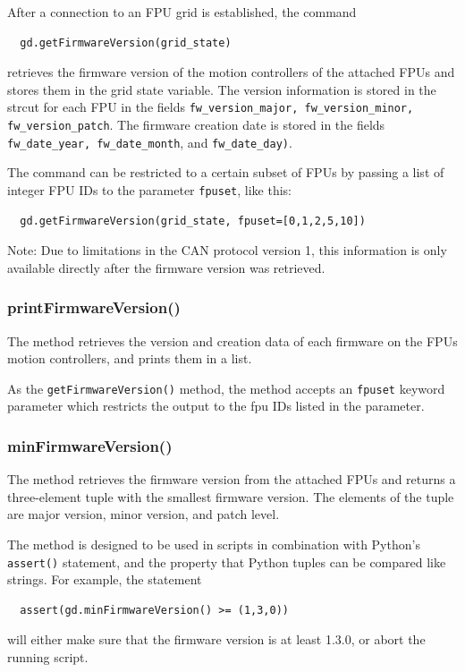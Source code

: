 \documentclass[11pt,a4paper]{scrartcl}
\begin{document}
After a connection to an FPU grid is established, the command
\begin{verbatim}
  gd.getFirmwareVersion(grid_state)
\end{verbatim}
retrieves the firmware version of the motion controllers of the
attached FPUs and stores them in the grid state variable. The version
information is stored in the strcut for each FPU in the fields
\texttt{fw\_version\_major, fw\_version\_minor, fw\_version\_patch}.
The firmware creation date is stored in the fields
\texttt{fw\_date\_year, fw\_date\_month}, and \texttt{fw\_date\_day)}.

The command can be restricted to a certain subset of FPUs
by passing a list of integer FPU IDs to the parameter
\texttt{fpuset}, like this:
  
\begin{verbatim}
  gd.getFirmwareVersion(grid_state, fpuset=[0,1,2,5,10])
\end{verbatim}

Note: Due to limitations in the CAN protocol version 1, this
information is only available directly after the firmware version was
retrieved.


\subsubsection{printFirmwareVersion()}
\label{sec:printfirmwareversion}

The method retrieves the version and creation data of each firmware on
the FPUs motion controllers, and prints them in a list.

As the \texttt{getFirmwareVersion()} method, the method accepts an
\texttt{fpuset} keyword parameter which restricts the output to the fpu IDs
listed in the parameter.

\subsubsection{minFirmwareVersion()}
\label{sec:minfirmwareversion}
The method retrieves the firmware version from the attached FPUs and
returns a three-element tuple with the smallest firmware version.  The
elements of the tuple are major version, minor version, and patch
level.

The method is designed to be used in scripts in combination with
Python's \texttt{assert()} statement, and the property that Python
tuples can be compared like strings. For example, the statement
\begin{verbatim}
  assert(gd.minFirmwareVersion() >= (1,3,0))
\end{verbatim}
will either make sure that the firmware version is at least 1.3.0, or
abort the running script.
\end{document}
